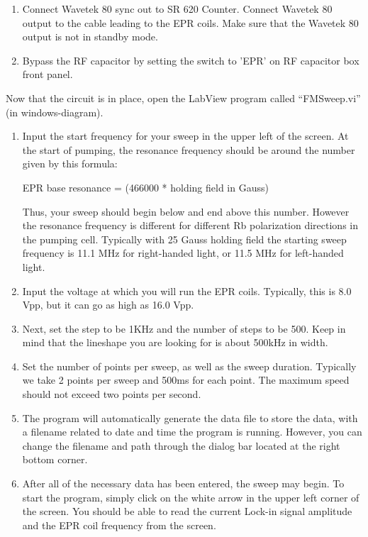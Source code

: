 {\begin{enumerate}
\item Connect Wavetek 80 sync out to SR 620 Counter.  Connect  Wavetek 80 output to 
the cable leading to the EPR coils.  Make sure that the Wavetek 80
output is not in standby mode. 

\item Bypass the RF capacitor by setting the switch to 'EPR' 
on RF capacitor box front panel.
\end{enumerate}


Now that the circuit is in place, open the LabView program called ``FMSweep.vi'' (in windows-diagram).


\begin{enumerate}

\item  Input the start frequency for your sweep in the upper
left of the screen.  At the start of
pumping, the resonance frequency should be around the number given by
this formula:

EPR base resonance = (466000 * holding field in Gauss)

Thus, your sweep should begin below and end above this number.
However the resonance frequency is different for different Rb polarization
directions 
in the pumping cell.  Typically with 25 Gauss holding field the starting 
sweep frequency is 11.1 MHz for right-handed light, 
or 11.5 MHz for left-handed light.  

\item Input the voltage at which you will run the EPR coils.  Typically,
this is 8.0 Vpp, but it can go as high as 16.0 Vpp.

\item Next, set the step to be 1KHz and the number of steps to be 500.
Keep in mind that the lineshape you are looking for is about 500kHz in
width. 
\item Set the number of points per sweep, as well as the sweep
duration.  Typically we take 2 points per sweep and 500ms for each point.
The maximum speed should not exceed two points per second. 

\item
The program will automatically generate the data file to store the data, 
with a filename related to date and time the program is running.  However,
you can change the filename and path through the dialog bar located at the
right bottom corner.

\item After all of the necessary data has been entered, the sweep may begin.  
To start the program, simply click on the white arrow in the upper
left corner of the screen.  You should be able to read the current Lock-in
signal amplitude and the EPR coil frequency from the screen.


\end{enumerate}}
